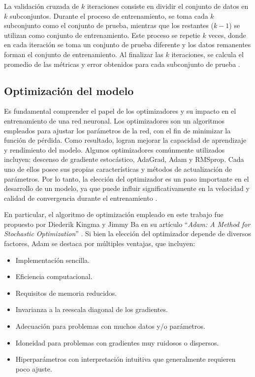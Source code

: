 La validación cruzada de $k$ iteraciones consiste en dividir el conjunto de datos en $k$ subconjuntos. Durante 
el proceso de entrenamiento, se toma cada $k$ subconjunto como el conjunto de prueba, mientras que los 
restantes ($k-1$) se utilizan como conjunto de entrenamiento. Este proceso se repetie $k$ veces, donde 
en cada iteración se toma un conjunto de prueba diferente y los datos remanentes forman el conjunto 
de entrenamiento. Al finalizar las $k$ iteraciones, se calcula el promedio de las métricas y error 
obtenidos para cada subconjunto de prueba \citep{CITE:48}.

\filbreak
\subsection{Optimización del modelo}
Es fundamental comprender el papel de los optimizadores y su impacto en el entrenamiento de una red neuronal. 
Los optimizadores son un algoritmos empleados para ajustar los parámetros de la red, con el fin de minimizar 
la función de pérdida. Como resultado, logran mejorar la capacidad de aprendizaje y rendimiento del modelo. 
Algunos optimizadores comúnmente utilizados incluyen: descenso de gradiente estocástico, AdaGrad, Adam y RMSprop. 
Cada uno de ellos posee sus propias características y métodos de actualización de parámetros. Por lo tanto, 
la elección del optimizador es un paso importante en el desarrollo de un modelo, ya que puede influir 
significativamente en la velocidad y calidad de convergencia durante el entrenamiento \citep{CITE:44}.


En particular, el algoritmo de optimización empleado en este trabajo fue propuesto por 
Diederik Kingma y Jimmy Ba en su artículo ``\emph{Adam: A Method for Stochastic Optimization}'' \citep{CITE:49}. Si bien 
la elección del optimizador depende de diversos factores, Adam se destaca por múltiples ventajas, que incluyen:

\begin{itemize}
	\item Implementación sencilla.
	\item Eficiencia computacional.
	\item Requisitos de memoria reducidos.
	\item Invarianza a la reescala diagonal de los gradientes.
	\item Adecuación para problemas con muchos datos y/o parámetros.
	\item Idoneidad para problemas con gradientes muy ruidosos o dispersos.
	\item Hiperparámetros con interpretación intuitiva que generalmente requieren poco ajuste.
\end{itemize}


